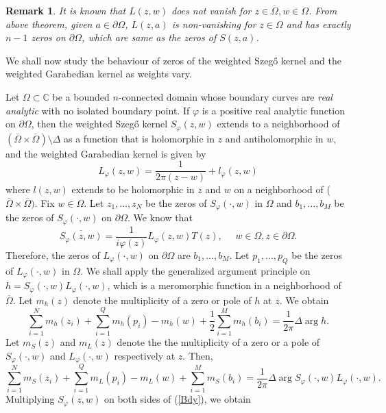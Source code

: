 \documentclass[11pt, reqno]{amsart}
\newtheorem{rem}[thm]{Remark}
\numberwithin{equation}{section}
\newcommand{\ov}{\overline}
\newcommand{\Om}{\Omega}
\begin{document}
	\begin{rem}
		It is known that $L(z, w)$ does not vanish for $z\in \overline{\Om}, w\in\Om$. From above theorem, given $a\in\partial\Om$, $L(z,a)$ is non-vanishing for $z\in\Om$ and has exactly $n-1$ zeros on $\partial\Om$, which are same as the zeros of $S(z,a)$.
	\end{rem}
	
	We shall now study the behaviour of zeros of the weighted Szeg\H{o} kernel and the weighted Garabedian kernel as weights vary.
	
	\medskip
	
	Let $\Omega\subset\mathbb{C}$ be a bounded $n$-connected domain whose boundary curves are {\it real analytic} with no isolated boundary point. If $\varphi$ is a positive real analytic function on $\partial\Omega$, then the weighted Szeg\H{o} kernel $S_{\varphi}(z,w)$ extends to a neighborhood of $(\overline{\Om}\times \overline{\Om})\setminus\Delta$ as a function that is holomorphic in $z$ and antiholomorphic in $w$, and the weighted Garabedian kernel is given by
	\[
	L_{\varphi}(z,w) = \frac{1}{2\pi(z-w)}+ l_{\varphi}(z,w)
	\]
	where $l(z,w)$ extends to be holomorphic in $z$ and $w$ on a neighborhood of ($\overline{\Om}\times\ov{\Om})$. Fix $w\in\Om$. Let $z_1,\ldots,z_N$ be the zeros of $S_{\varphi}(\cdot,w)$ in $\Om$ and $b_1,\ldots,b_M$ be the zeros of $S_{\varphi}(\cdot, w)$ on $\partial\Om$. We know that
	\begin{equation}\label{Bdy}
		\overline{S_{\varphi}(z,w)} = \frac{1}{i\varphi(z)}L_{\varphi}(z,w)T(z),
		\quad\,\,
		w\in\Om, z\in\partial\Omega.
	\end{equation}
	Therefore, the zeros of $L_{\varphi}(\cdot, w)$ on $\partial\Om$ are $b_1,\ldots, b_M$. Let $p_1,\ldots, p_Q$ be the zeros of $L_{\varphi}(\cdot,w)$ in $\Om$. We shall apply the generalized argument principle on $h = S_{\varphi}(\cdot,w)L_{\varphi}(\cdot,w)$, which is a meromorphic function in a neighborhood of $\overline{\Om}$. Let $m_h(z)$ denote the multiplicity of a zero or pole of $h$ at $z$. We obtain
	\[
	\sum_{i=1}^N m_h(z_i) + \sum_{i=1}^Q m_h(p_i) - m_h(w) + \frac{1}{2}\sum_{i=1}^M m_h(b_i)
	=
	\frac{1}{2\pi} \Delta \arg h.
	\]
	Let $m_S(z)$ and $m_L(z)$ denote the the multiplicity of a zero or a pole of $S_{\varphi}(\cdot,w)$ and $L_{\varphi}(\cdot, w)$ respectively at $z$. Then,
	\[
	\sum_{i=1}^N m_S(z_i) + \sum_{i=1}^Q m_L(p_i) - m_L(w) + \sum_{i=1}^M m_S(b_i) 
	=
	\frac{1}{2\pi} \Delta \arg S_{\varphi}(\cdot,w)L_{\varphi}(\cdot,w).
	\]
	Multiplying $S_{\varphi}(z,w)$ on both sides of (\ref{Bdy}), we obtain
\end{document}
